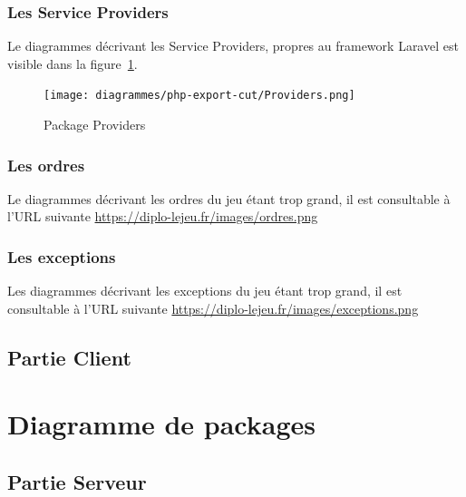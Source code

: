         \subsubsection{Les Service Providers}
        Le diagrammes décrivant les Service Providers, propres au framework Laravel est visible dans la figure~\ref{pproviders}.

			\begin{figure}[H]
				\centering
                \texttt{[image: diagrammes/php-export-cut/Providers.png]}
                \caption{\label{pproviders}Package Providers}
			\end{figure}

		\subsubsection{Les ordres}
        Le diagrammes décrivant les ordres du jeu étant trop grand, il est consultable à l'URL suivante \url{https://diplo-lejeu.fr/images/ordres.png}

		\subsubsection{Les exceptions}
        Les diagrammes décrivant les exceptions du jeu étant trop grand, il est consultable à l'URL suivante \url{https://diplo-lejeu.fr/images/exceptions.png}

    \pagebreak
	\subsection{Partie Client}

\section{Diagramme de packages}
	\subsection{Partie Serveur}
